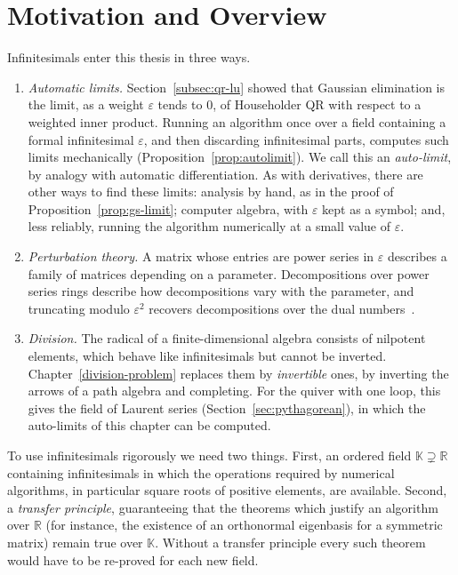\documentclass[12pt, a4paper]{report}
\theoremstyle{plain}
\theoremstyle{definition}
\theoremstyle{remark}
\theoremstyle{plain}
\newcommand{\RR}{\mathbb{R}}
\newcommand{\KK}{\mathbb{K}}
\begin{document}
\section{Motivation and Overview}
\label{sec:inf-motivation}
Infinitesimals enter this thesis in three ways.
\begin{enumerate}
  \item \emph{Automatic limits.} Section~\ref{subsec:qr-lu} showed that Gaussian elimination is the limit, as a weight $\varepsilon$ tends to $0$, of Householder QR with respect to a weighted inner product. Running an algorithm once over a field containing a formal infinitesimal $\varepsilon$, and then discarding infinitesimal parts, computes such limits mechanically (Proposition~\ref{prop:autolimit}). We call this an \emph{auto-limit}, by analogy with automatic differentiation. As with derivatives, there are other ways to find these limits: analysis by hand, as in the proof of Proposition~\ref{prop:gs-limit}; computer algebra, with $\varepsilon$ kept as a symbol; and, less reliably, running the algorithm numerically at a small value of $\varepsilon$.
  \item \emph{Perturbation theory.} A matrix whose entries are power series in $\varepsilon$ describes a family of matrices depending on a parameter. Decompositions over power series rings describe how decompositions vary with the parameter, and truncating modulo $\varepsilon^2$ recovers decompositions over the dual numbers~\cite{Gutin2022DualNumbers}.
  \item \emph{Division.} The radical of a finite-dimensional algebra consists of nilpotent elements, which behave like infinitesimals but cannot be inverted. Chapter~\ref{division-problem} replaces them by \emph{invertible} ones, by inverting the arrows of a path algebra and completing. For the quiver with one loop, this gives the field of Laurent series (Section~\ref{sec:pythagorean}), in which the auto-limits of this chapter can be computed.
\end{enumerate}

To use infinitesimals rigorously we need two things. First, an ordered field $\KK\supsetneq\RR$ containing infinitesimals in which the operations required by numerical algorithms, in particular square roots of positive elements, are available. Second, a \emph{transfer principle}, guaranteeing that the theorems which justify an algorithm over $\RR$ (for instance, the existence of an orthonormal eigenbasis for a symmetric matrix) remain true over $\KK$. Without a transfer principle every such theorem would have to be re-proved for each new field.
\end{document}
